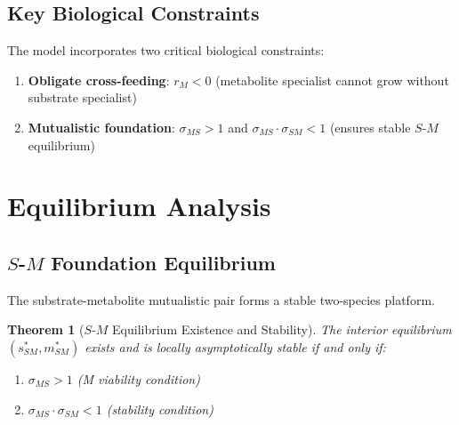 \documentclass[11pt]{article}
\newtheorem{theorem}{Theorem}
\begin{document}
\subsection{Key Biological Constraints}

The model incorporates two critical biological constraints:

\begin{enumerate}
    \item \textbf{Obligate cross-feeding}: $r_M < 0$ (metabolite specialist cannot grow without substrate specialist)
    \item \textbf{Mutualistic foundation}: $\sigma_{MS} > 1$ and $\sigma_{MS} \cdot \sigma_{SM} < 1$ (ensures stable $S$-$M$ equilibrium)
\end{enumerate}

\section{Equilibrium Analysis}

\subsection{$S$-$M$ Foundation Equilibrium}

The substrate-metabolite mutualistic pair forms a stable two-species platform.

\begin{theorem}[$S$-$M$ Equilibrium Existence and Stability]
The interior equilibrium $(s^*_{SM}, m^*_{SM})$ exists and is locally asymptotically stable if and only if:
\begin{enumerate}
    \item $\sigma_{MS} > 1$ (M viability condition)
    \item $\sigma_{MS} \cdot \sigma_{SM} < 1$ (stability condition)
\end{enumerate}
\end{theorem}
\end{document}
